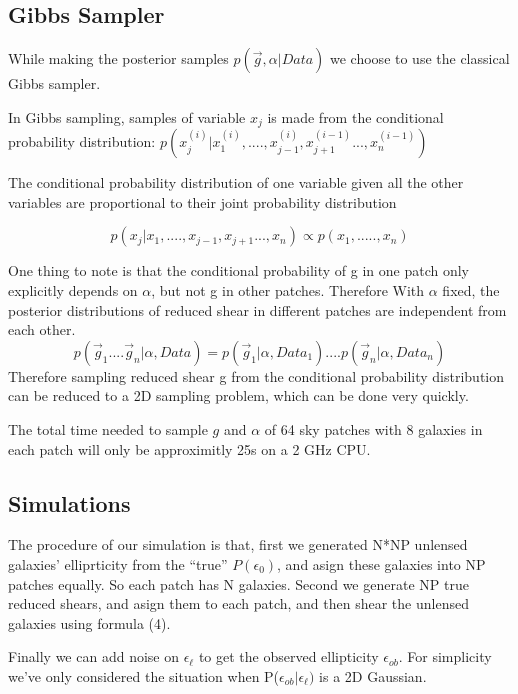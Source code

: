 \documentclass[useAMS,usenatbib]{mn2e}
\begin{document}
\subsection{Gibbs Sampler}

While making the posterior samples $p(\vec{g},\alpha|Data)$ we choose to
use the classical Gibbs sampler.

In Gibbs sampling, samples of variable $x_{j}$ is made from the conditional
probability distribution: $p(x_{j}^{(i)}|x_{1}^{(i)},....,x_{j-1}^{(i)},x_{j+1}^{(i-1)}...,x_{n}^{(i-1)})$

The conditional probability distribution of one variable given all the other variables are proportional to their joint probability distribution

\begin{equation}
p(x_{j}|x_{1},....,x_{j-1},x_{j+1}...,x_{n})\propto p(x_{1},.....,x_{n})
\end{equation}


One thing to note is that the conditional probability of g in one patch only explicitly depends on $\alpha$, but not g in other patches. Therefore
With $\alpha$ fixed, the posterior distributions of reduced shear in different patches are independent from each other. 
\begin{equation}
p(\vec{g}_{1}....\vec{g}_{n}|\alpha,Data)=p(\vec{g}_{1}|\alpha,Data_{1})....p(\vec{g}_{n}|\alpha,Data_{n})
\end{equation}
Therefore sampling reduced shear g from the conditional probability distribution can be reduced to a 2D sampling problem, which can be done very quickly.

The total time needed to sample $g$ and $\alpha$ of 64 sky patches with 8 galaxies in each patch will only be 
approximitly 25s on a 2 GHz CPU.


\subsection{Simulations}

The procedure of our simulation is that, first we generated N{*}NP
unlensed galaxies' elliprticity from the ``true'' $P(\epsilon_{0})$, and
asign these galaxies into NP patches equally. So each patch has N galaxies. Second
we generate NP true reduced shears, and asign them to each patch, and
then shear the unlensed galaxies using formula (4).

Finally we can add noise on $\epsilon_{\ell}$ to get the
observed ellipticity $\epsilon_{ob}$. For simplicity we've only considered
the situation when P($\epsilon_{ob}|\epsilon_{\ell})$ is a 2D Gaussian.
\end{document}
